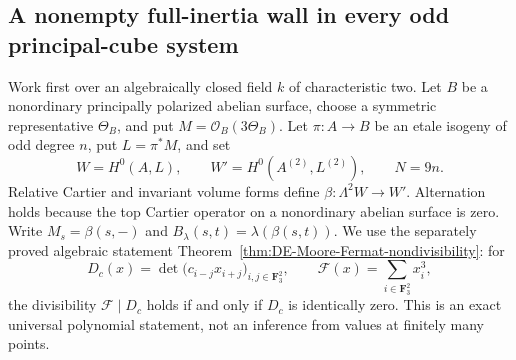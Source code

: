 \subsection{A nonempty full-inertia wall in every odd principal-cube system}
\label{subsec:ppav-all-odd-full-root-inertia}

Work first over an algebraically closed field \(k\) of characteristic two.
Let \(B\) be a nonordinary principally polarized abelian surface, choose
a symmetric representative \(\Theta_B\), and put
\(M=\mathcal O_B(3\Theta_B)\).  Let \(\pi:A\to B\) be an etale
isogeny of odd degree \(n\), put \(L=\pi^*M\), and set
\[
 W=H^0(A,L),\qquad W'=H^0(A^{(2)},L^{(2)}),\qquad N=9n.
 \tag{OW1}
\]
Relative Cartier and invariant volume forms define
\(\beta:\Lambda^2W\to W'\).  Alternation holds because the top
Cartier operator on a nonordinary abelian surface is zero.  Write
\(M_s=\beta(s,-)\) and \(B_\lambda(s,t)=\lambda(\beta(s,t))\).
We use the separately proved algebraic statement
Theorem~\ref{thm:DE-Moore-Fermat-nondivisibility}: for
\[
 D_c(x)=\det\bigl(c_{i-j}x_{i+j}\bigr)_{i,j\in\mathbf F_3^2},
 \qquad \mathcal F(x)=\sum_{i\in\mathbf F_3^2}x_i^3,
 \tag{OW2}
\]
the divisibility \(\mathcal F\mid D_c\) holds if and only if
\(D_c\) is identically zero.  This is an exact universal polynomial
statement, not an inference from values at finitely many points.

